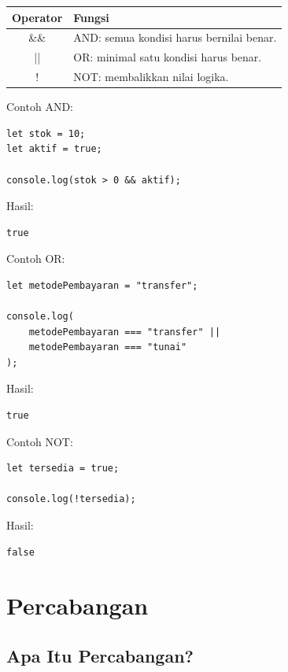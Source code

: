 \documentclass[12pt,a4paper]{article}
\begin{document}
\begin{center}
\begin{tabularx}{\textwidth}{cX}
\toprule
\textbf{Operator} & \textbf{Fungsi} \\
\midrule
\&\& & AND: semua kondisi harus bernilai benar. \\
|| & OR: minimal satu kondisi harus benar. \\
! & NOT: membalikkan nilai logika. \\
\bottomrule
\end{tabularx}
\end{center}

Contoh AND:

\begin{lstlisting}
let stok = 10;
let aktif = true;

console.log(stok > 0 && aktif);
\end{lstlisting}

Hasil:

\begin{lstlisting}
true
\end{lstlisting}

Contoh OR:

\begin{lstlisting}
let metodePembayaran = "transfer";

console.log(
    metodePembayaran === "transfer" ||
    metodePembayaran === "tunai"
);
\end{lstlisting}

Hasil:

\begin{lstlisting}
true
\end{lstlisting}

Contoh NOT:

\begin{lstlisting}
let tersedia = true;

console.log(!tersedia);
\end{lstlisting}

Hasil:

\begin{lstlisting}
false
\end{lstlisting}

\section{Percabangan}

\subsection{Apa Itu Percabangan?}
\end{document}

